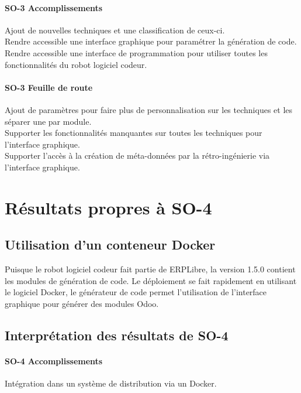 \paragraph{SO-3 Accomplissements}
Ajout de nouvelles techniques et une classification de ceux-ci.\\
Rendre accessible une interface graphique pour paramétrer la génération de code.\\
Rendre accessible une interface de programmation pour utiliser toutes les fonctionnalités du robot logiciel codeur.

\paragraph{SO-3 Feuille de route}
Ajout de paramètres pour faire plus de personnalisation sur les techniques et les séparer une par module.\\
Supporter les fonctionnalités manquantes sur toutes les techniques pour l’interface graphique.\\
Supporter l’accès à la création de méta-données par la rétro-ingénierie via l’interface graphique.

\section{Résultats propres à SO-4}

\subsection{Utilisation d’un conteneur Docker}

Puisque le robot logiciel codeur fait partie de ERPLibre, la version 1.5.0 contient les modules de génération de code. Le déploiement se fait rapidement en utilisant le logiciel Docker, le générateur de code permet l’utilisation de l’interface graphique pour générer des modules Odoo.

\subsection{Interprétation des résultats de SO-4}

\paragraph{SO-4 Accomplissements}
Intégration dans un système de distribution via un Docker.

